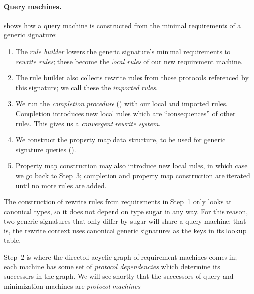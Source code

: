 \documentclass[../generics]{subfiles}
\begin{document}
\paragraph{Query machines.}
 shows how a query machine is constructed from the minimal requirements of a generic signature:
\begin{enumerate}
\item The \emph{rule builder} lowers the generic signature's minimal requirements to \emph{rewrite rules}; these become the \emph{local rules} of our new requirement machine.

\item The rule builder also collects rewrite rules from those protocols referenced by this signature; we call these the \emph{imported rules}.

\item We run the \emph{completion procedure} () with our local and imported rules. Completion introduces new local rules which are ``consequences'' of other rules. This gives us a \emph{convergent rewrite system}.

\item We construct the property map data structure, to be used for generic signature queries (). 

\item Property map construction may also introduce new local rules, in which case we go back to Step~3; completion and property map construction are iterated until no more rules are added.
\end{enumerate}

The construction of rewrite rules from requirements in Step~1 only looks at canonical types, so it does not depend on type sugar in any way. For this reason, two generic signatures that only differ by sugar will share a query machine; that is, the rewrite context uses canonical generic signatures as the keys in its lookup table.

Step~2 is where the directed acyclic graph of requirement machines comes in; each machine has some set of \emph{protocol dependencies} which determine its successors in the graph. We will see shortly that the successors of query and minimization machines are \emph{protocol machines}.
\end{document}
